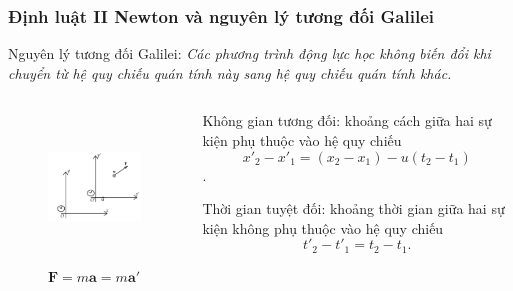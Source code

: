 \begin{frame}
    \frametitle{Định luật II Newton và nguyên lý tương đối Galilei}
    Nguyên lý tương đối Galilei:\emph{ Các phương trình động lực học không biến đổi khi chuyển từ hệ quy chiếu quán tính này sang hệ quy chiếu quán tính khác.}
    \begin{columns}
        \begin{column}{0.5\textwidth}
            \vspace{-5pt}

            \begin{figure}
                \centering
                \includegraphics[width=6cm, height=4cm]{Slides/Figure/Galilei.png}
                \caption{\(\mathbf{F}=m\mathbf{a}=m\mathbf{a'}\)}
            \end{figure}
        \end{column}
        \begin{column}{0.5\textwidth}
            \vspace{5pt}

            Không gian tương đối: khoảng cách giữa hai sự kiện phụ thuộc vào hệ quy chiếu 
            \[x'_2 -x'_1 =(x_2 -x_1)-u(t_2 -t_1)\].
            \vspace{-5pt}

            Thời gian tuyệt đối: khoảng thời gian giữa hai sự kiện không phụ thuộc vào hệ quy chiếu
            \[t'_2 -t'_1 =t_2 -t_1 . \]
        \end{column}
    \end{columns}     
\end{frame}
